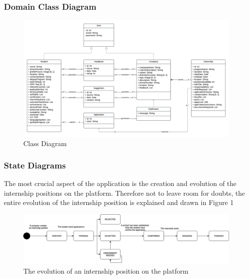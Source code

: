 \subsubsection{Domain Class Diagram}
\begin{figure}[h!]
    \centering
    \includegraphics[width=1\textwidth]{RASD/Images/ClassDiagram.png}
    \caption{Class Diagram}
    \label{fig:example}
\end{figure}


\subsubsection{State Diagrams}
The most crucial aspect of the application is the creation and evolution of the internship positions on the platform. Therefore not to leave room for doubts, the entire evolution of the internship position is explained and drawn in Figure 1
\begin{figure}[h!]
    \centering
    \includegraphics[width=1\textwidth]{RASD/Images/InternshipProcess.png}
    \caption{The evolution of an internship position on the platform}
    \label{fig:example}
\end{figure}



